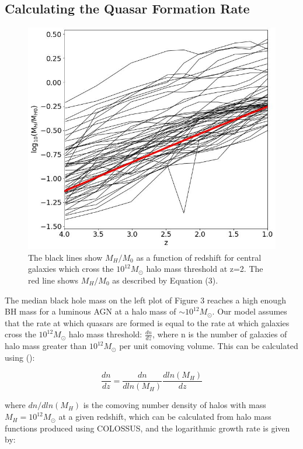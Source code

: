 \documentclass[12pt]{article}%
\begin{document}
 \subsection{Calculating the Quasar Formation Rate}

 \begin{figure}[H]
\centering
\includegraphics[width=\linewidth]{Plot_5.jpeg}
\caption{The black lines show $M_H/M_0$ as a function of redshift for central galaxies which cross the $10^{12}M_\odot$ halo mass threshold at z=2. The red line shows $M_H/M_0$ as described by Equation (3).}
\label{fig:5}
\end{figure}

The median black hole mass on the left plot of Figure 3 reaches a high enough BH mass for a luminous AGN at a halo mass of $\sim10^{12}M_\odot$. Our model assumes that the rate at which quas\-ars are formed is equal to the rate at which galaxies cross the $10^{12}M_\odot$ halo mass threshold: $\frac{dn}{dz}$, where n is the number of galaxies of halo mass greater than $10^{12}M_\odot$ per unit comoving volume. This can be calculated using (\cite{Correa}):

\begin{equation}
    \frac{dn}{dz}=\frac{dn}{dln(M_H)}\frac{dln(M_H)}{dz}
\end{equation}

\noindent where $dn/dln(M_H)$ is the comoving number density of halos with mass $M_H=10^{12}M_\odot$ at a given redshift, which can be calculated from halo mass functions produced using COLOSSUS, and the logarithmic growth rate is given by:
\end{document}
